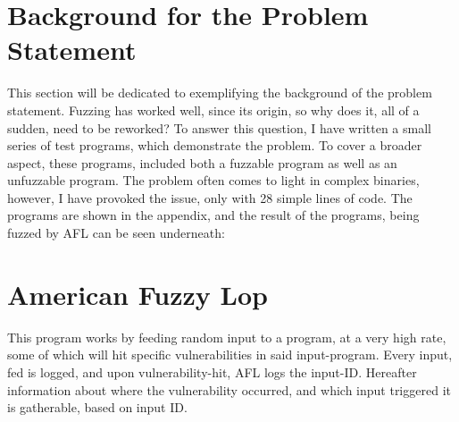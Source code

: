 \documentclass[a4paper]{article}
\begin{document}
\section{Background for the Problem Statement}
\label{sec:Background}
This section will be dedicated to exemplifying the background of the problem statement. Fuzzing has worked well, since its origin, so why does it, all of a sudden, need to be reworked? To answer this question, I have written a small series of test programs, which demonstrate the problem. To cover a broader aspect, these programs, included both a fuzzable program as well as an unfuzzable program. The problem often comes to light in complex binaries, however, I have provoked the issue, only with 28 simple lines of code. The programs are shown in the appendix, and the result of the programs, being fuzzed by AFL can be seen underneath:\\
\centerline{}
\centerline{}
\newpage
\section{American Fuzzy Lop}
\label{sec:AFL}
This program works by feeding random input to a program, at a very high rate, some of which will hit specific vulnerabilities in said input-program. Every input, fed is logged, and upon vulnerability-hit, AFL logs the input-ID. Hereafter information about where the vulnerability occurred, and which input triggered it is gatherable, based on input ID.
\end{document}
